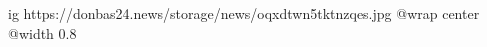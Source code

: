  
 
 
 
 

\ifcmt
  ig https://donbas24.news/storage/news/oqxdtwn5tktnzqes.jpg
  @wrap center
  @width 0.8
\fi
